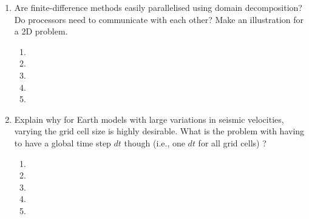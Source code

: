 \begin{enumerate}
\begin{enumerate}
\item[] 
\item[]
\item[] 
\end{enumerate}
\item Are finite-difference methods easily parallelised using domain decomposition? Do processors need to communicate with each other? Make an illustration for a 2D problem.  
\begin{enumerate}
\item[]
\item[]
\item[] 
\item[]
\item[] 
\end{enumerate}
\item Explain why for Earth models with large variations in seismic velocities, varying the grid cell size is highly desirable. What is the problem with having to have a global time step $dt$ though (i.e., one $dt$ for all grid cells) ?
\begin{enumerate}
\item[]
\item[]
\item[] 
\item[]
\item[] 
\end{enumerate}
\end{enumerate}

